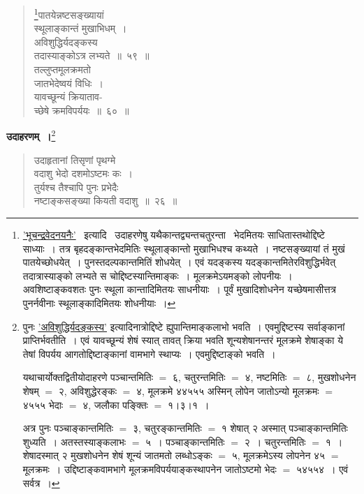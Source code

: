 \documentclass[11pt, openany]{book}
\begin{document}
 \label{13.59}
\begin{quote}
\renewcommand{\thefootnote}{१}\footnote{\hyperref[Ex 13.20]{'भूचन्द्रवेदनयनैः'} ~इत्यादि ~उदाहरणेषु \;यथैकान्तद्व्यन्तचतुरन्ता ~भेदमितयः \;साधितास्तथोद्दिष्टे साध्याः~। तत्र बृहदङ्कान्तभेदमितिः स्थूलाङ्कान्तो मुखाभिधश्च कथ्यते~। नष्टसङ्ख्यायां तं मुखं पातयेच्छोधयेत्~। पुनस्तदल्पकान्तमितिं शोधयेत्~। एवं यदङ्कस्य यदङ्कान्तमितेरविशुद्धिर्भवेत् तदात्रास्याङ्को लभ्यते स चोद्दिष्टस्यान्तिमाङ्कः~। मूलक्रमेऽयमङ्को लोपनीयः~। अवशिष्टाङ्कवशतः पुनः स्थूला कान्तादिमितयः साधनीयाः~। पूर्वं मुखादिशोधनेन यच्छेषमासीत्तत्र पुनर्नवीनाः स्थूलाङ्कादिमितयः शोधनीयाः~।}{\gk पातयेन्नष्टसङ्ख्यायां\\
स्थूलाङ्कान्तं मुखाभिधम्~।\\
अविशुद्धिर्यदङ्कस्य\\
तदास्याङ्कोऽत्र लभ्यते~॥~५९~॥\\
तल्लुप्तमूलक्रमतो\\
जातभेदेष्वयं विधिः~।\\
यावच्छून्यं क्रियाताव-\\
च्छेषे क्रमविपर्ययः~॥~६०~॥}
\end{quote}

\newpage

\textbf{उदाहरणम्~।}\renewcommand{\thefootnote}{}\footnote{\hspace{-8mm} पुनः \hyperref[13.59]{'अविशुद्धिर्यदङ्कस्य'} इत्यादिनात्रोद्दिष्टे ह्युपान्तिमाङ्कलाभो भवति~। एवमुद्दिष्टस्य सर्वाङ्कानां प्राप्तिर्भवतीति~। एवं  यावच्छून्यं शेषं स्यात् तावत् क्रिया भवति शून्यशेषानन्तरं मूलक्रमे शेषाङ्का ये तेषां विपर्यय आगतोद्दिष्टाङ्कानां वामभागे स्थाप्यः~। एवमुद्दिष्टाङ्को भवति~।

\hspace{3mm} यथाचार्योक्तद्वितीयोदाहरणे पञ्चान्तमितिः $=$ ६, चतुरन्तमितिः $=$ ४, नष्टमितिः $=$ ८, मुखशोधनेन शेषम् $=$ २, अविशुद्धेरङ्कः $=$ ४, मूलक्रमे ४४५५५ अस्मिन् लोपेन जातोऽन्यो मूलक्रमः $=$ ४५५५ भेदाः $=$ ४, जलौका पङ्क्तिः $=$ १।३।१~।

\hspace{3mm} अत्र पुनः पञ्चाङ्कान्तमितिः $=$ ३, चतुरङ्कान्तमितिः $=$ १ शेषात् २ अस्मात् पञ्चाङ्कान्तमितिः शुध्यति~। अतस्तस्याङ्कलाभः $=$ ५~। पञ्चाङ्कान्तमितिः $=$ २~। चतुरन्तमितिः $=$ १~। शेषादस्मात् २ मुखशोधनेन शेषं शून्यं जातमतो लब्धोऽङ्कः $=$ ५, मूलक्रमेऽस्य लोपनेन ४५ $=$ मूलक्रमः~। उद्दिष्टाङ्कवामभागे मूलक्रमविपर्ययाङ्कस्थापनेन जातोऽष्टमो भेदः $=$ ५४५५४~। एवं सर्वत्र~।}

\begin{quote}
{\ex उदाहृतानां तिसृणां पृथग्मे\\
वदाशु भेदो दशमोऽष्टमः कः~। \\
तुर्यश्च तैश्चापि पुनः प्रभेदैः\\
नष्टाङ्कसङ्ख्या कियती वदाशु~॥~२६~॥}
\end{quote}
\end{document}
